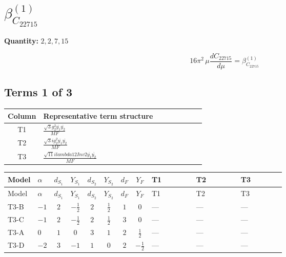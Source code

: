 \documentclass[8pt]{article}
\begin{document}
\begin{landscape}
\begin{longtable}{@{}llcccccc >{\raggedright\arraybackslash}p{0.21\linewidth} >{\raggedright\arraybackslash}p{0.21\linewidth} >{\raggedright\arraybackslash}p{0.21\linewidth}@{}}
\midrule
\bottomrule
\end{longtable}
\clearpage
\section*{$\beta_{C_{22715}}^{(1)}$}
\noindent\textbf{Quantity: }$\mathrm{2,2,7,15}$\par\smallskip
\[16\pi^2\,\mu\frac{d C_{22715}}{d\mu}=\beta_{C_{22715}}^{(1)}\]
\subsection*{Terms 1 of 3}
\begin{center}
\begin{tabular}{@{}c >{\raggedright\arraybackslash}p{0.82\linewidth}@{}}
\toprule
Column & Representative term structure \\
\midrule
T1 & \(\displaystyle \frac{\sqrt{3} g_{2}^{2} \overline{y_{1}} \overline{y_{2}}}{MF}\) \\
\midrule
T2 & \(\displaystyle \frac{\sqrt{3} i g_{2}^{2} \overline{y_{1}} \overline{y_{2}}}{MF}\) \\
\midrule
T3 & \(\displaystyle \frac{\sqrt{11} i lambda12Inv2 \overline{y_{1}} \overline{y_{2}}}{MF}\) \\
\midrule
\bottomrule
\end{tabular}
\end{center}
\smallskip
\tiny
\begin{longtable}{@{}llcccccc >{\raggedright\arraybackslash}p{0.21\linewidth} >{\raggedright\arraybackslash}p{0.21\linewidth} >{\raggedright\arraybackslash}p{0.21\linewidth}@{}}
\toprule
Model & $\alpha$ & $d_{S_1}$ & $Y_{S_1}$ & $d_{S_2}$ & $Y_{S_2}$ & $d_F$ & $Y_F$ & T1 & T2 & T3 \\
\midrule
\endfirsthead
\toprule
Model & $\alpha$ & $d_{S_1}$ & $Y_{S_1}$ & $d_{S_2}$ & $Y_{S_2}$ & $d_F$ & $Y_F$ & T1 & T2 & T3 \\
\midrule
\endhead
T3-B & $-1$ & $2$ & $-\frac{1}{2}$ & $2$ & $\frac{1}{2}$ & $1$ & $0$ & --- & --- & --- \\
\midrule
T3-C & $-1$ & $2$ & $-\frac{1}{2}$ & $2$ & $\frac{1}{2}$ & $3$ & $0$ & --- & --- & --- \\
\midrule
T3-A & $0$ & $1$ & $0$ & $3$ & $1$ & $2$ & $\frac{1}{2}$ & --- & --- & --- \\
\midrule
T3-D & $-2$ & $3$ & $-1$ & $1$ & $0$ & $2$ & $-\frac{1}{2}$ & --- & --- & --- \\
\midrule

\end{longtable}
\end{landscape}
\end{document}
